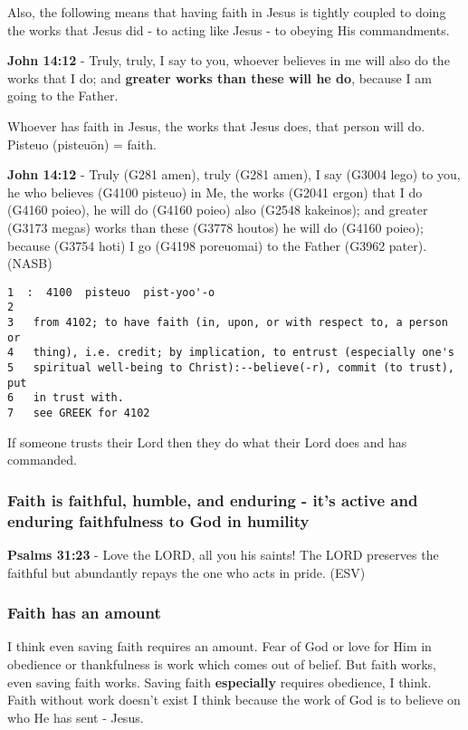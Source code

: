 \documentclass[11pt]{article}
\begin{document}
Also, the following means that having faith in Jesus is tightly coupled to doing the works that Jesus did - to acting like Jesus - to obeying His commandments.

\textbf{John 14:12} - Truly, truly, I say to you, whoever believes in me will also do the works that I do; and \textbf{greater works than these will he do}, because I am going to the Father.

Whoever has faith in Jesus, the works that Jesus does, that person will do.
Pisteuo (pisteuōn) = faith.

\textbf{John 14:12} - Truly (G281 amen), truly (G281 amen), I say (G3004 lego) to you, he who believes (G4100 pisteuo) in Me, the works (G2041 ergon) that I do (G4160 poieo), he will do (G4160 poieo) also (G2548 kakeinos); and greater (G3173 megas) works than these (G3778 houtos) he will do (G4160 poieo); because (G3754 hoti) I go (G4198 poreuomai) to the Father (G3962 pater). (NASB)

\begin{verbatim}
1  :  4100  pisteuo  pist-yoo'-o
2  
3   from 4102; to have faith (in, upon, or with respect to, a person or
4   thing), i.e. credit; by implication, to entrust (especially one's
5   spiritual well-being to Christ):--believe(-r), commit (to trust), put
6   in trust with.
7   see GREEK for 4102
\end{verbatim}

If someone trusts their Lord then they do what their Lord does and has commanded.

\subsubsection{Faith is faithful, humble, and enduring - it's active and enduring faithfulness to God in humility}
\label{sec:org5569ac4}
\textbf{Psalms 31:23} - Love the LORD, all you his saints! The LORD preserves the faithful but abundantly repays the one who acts in pride. (ESV)

\subsubsection{Faith has an amount}
\label{sec:org85c3702}
I think even saving faith requires an amount.
Fear of God or love for Him in obedience or thankfulness is work which comes out of belief.
But faith works, even saving faith works. Saving faith \textbf{especially} requires obedience, I think.
Faith without work doesn't exist I think because the work of God is to believe on who He has sent - Jesus.
\end{document}
